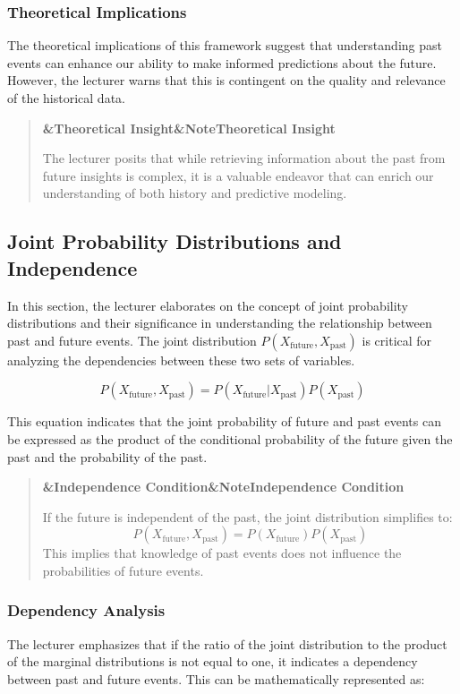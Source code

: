\documentclass[a4paper]{article}
\newcommand{\boxheading}[1]{%
  \par\smallskip
  \noindent\textbf{\ifx&#1&Note\else#1\fi}\par
  \smallskip
}
\newenvironment{thmbox}[1][]{%
  \begin{quote}\color{blue!60!black}\boxheading{#1}\normalcolor
}{\end{quote}}
\newenvironment{rembox}[1][]{%
  \begin{quote}\color{black!70}\boxheading{#1}\normalcolor
}{\end{quote}}
\begin{document}
\subsubsection{Theoretical Implications}
The theoretical implications of this framework suggest that understanding past events can enhance our ability to make informed predictions about the future. However, the lecturer warns that this is contingent on the quality and relevance of the historical data.

\begin{thmbox}[Theoretical Insight]
The lecturer posits that while retrieving information about the past from future insights is complex, it is a valuable endeavor that can enrich our understanding of both history and predictive modeling.
\end{thmbox}

\subsection{Joint Probability Distributions and Independence}
In this section, the lecturer elaborates on the concept of joint probability distributions and their significance in understanding the relationship between past and future events. The joint distribution \( P(X_{\text{future}}, X_{\text{past}}) \) is critical for analyzing the dependencies between these two sets of variables.

\begin{equation}
P(X_{\text{future}}, X_{\text{past}}) = P(X_{\text{future}} | X_{\text{past}}) P(X_{\text{past}})
\end{equation}

This equation indicates that the joint probability of future and past events can be expressed as the product of the conditional probability of the future given the past and the probability of the past.

\begin{rembox}[Independence Condition]
If the future is independent of the past, the joint distribution simplifies to:
\begin{equation}
P(X_{\text{future}}, X_{\text{past}}) = P(X_{\text{future}}) P(X_{\text{past}})
\end{equation}
This implies that knowledge of past events does not influence the probabilities of future events.
\end{rembox}

\subsubsection{Dependency Analysis}
The lecturer emphasizes that if the ratio of the joint distribution to the product of the marginal distributions is not equal to one, it indicates a dependency between past and future events. This can be mathematically represented as:
\end{document}
